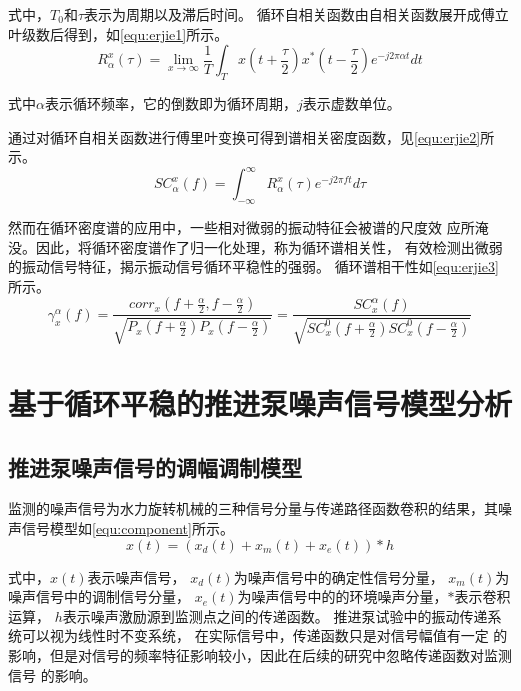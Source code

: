 式中，$T_0$和$\tau$表示为周期以及滞后时间。
循环自相关函数由自相关函数展开成傅立叶级数后得到，如\autoref{equ:erjie1}所示。
\begin{equation}
    \label{equ:erjie1}
    R_{\alpha }^{x} \left ( \tau  \right ) =\lim_{x \to \infty} \frac{1}{T}\int_{T}^{}x\left ( t+\frac{\tau }{2}  \right )x^{\ast } \left ( t-\frac{\tau }{2} \right ) e^{-j2\pi \alpha t} dt   
\end{equation}

式中$\alpha$表示循环频率，它的倒数即为循环周期，$j$表示虚数单位。

通过对循环自相关函数进行傅里叶变换可得到谱相关密度函数，见\autoref{equ:erjie2}所示。
\begin{equation}
    \label{equ:erjie2}
    SC_{\alpha }^{x} \left ( f  \right ) =\int_{-\infty }^{\infty } R_{\alpha }^{x}\left ( \tau  \right )  e^{-j2\pi f t} d\tau   
\end{equation}

然而在循环密度谱的应用中，一些相对微弱的振动特征会被谱的尺度效
应所淹没。因此，将循环密度谱作了归一化处理，称为循环谱相关性，
有效检测出微弱的振动信号特征，揭示振动信号循环平稳性的强弱。
循环谱相干性如\autoref{equ:erjie3}所示。
\begin{equation}
    \label{equ:erjie3}
    \gamma _{x}^{\alpha}\left ( f \right ) =\frac{corr_{x}\left ( f+\frac{\alpha }{2}, f-\frac{\alpha }{2} \right )  }{\sqrt{P_{x}\left ( f+\frac{\alpha }{2} \right )P_{x}\left ( f-\frac{\alpha }{2} \right ) } } =\frac{SC_{x}^{\alpha }\left ( f \right )  }{\sqrt{SC_{x}^{0} \left ( f+\frac{\alpha }{2} \right )SC_{x}^{0} \left ( f-\frac{\alpha }{2} \right )} }  
\end{equation}

\section{基于循环平稳的推进泵噪声信号模型分析}
\subsection{推进泵噪声信号的调幅调制模型}
监测的噪声信号为水力旋转机械的三种信号分量与传递路径函数卷积的结果，其噪声信号模型如\autoref{equ:component}所示。 
\begin{equation}
    \label{equ:component}
    x\left ( t \right ) =\left ( x_d\left ( t \right )+x_m\left ( t \right )+x_e\left ( t \right ) \right )\ast h 
\end{equation}

式中，$x\left ( t \right )$表示噪声信号，
$x_d\left ( t \right )$为噪声信号中的确定性信号分量，
$x_m\left ( t \right )$为噪声信号中的调制信号分量，
$x_e\left ( t \right )$为噪声信号中的的环境噪声分量，$\ast$表示卷积运算，
$h$表示噪声激励源到监测点之间的传递函数。 
推进泵试验中的振动传递系统可以视为线性时不变系统，
在实际信号中，传递函数只是对信号幅值有一定
的影响，但是对信号的频率特征影响较小，因此在后续的研究中忽略传递函数对监测信号
的影响。 


